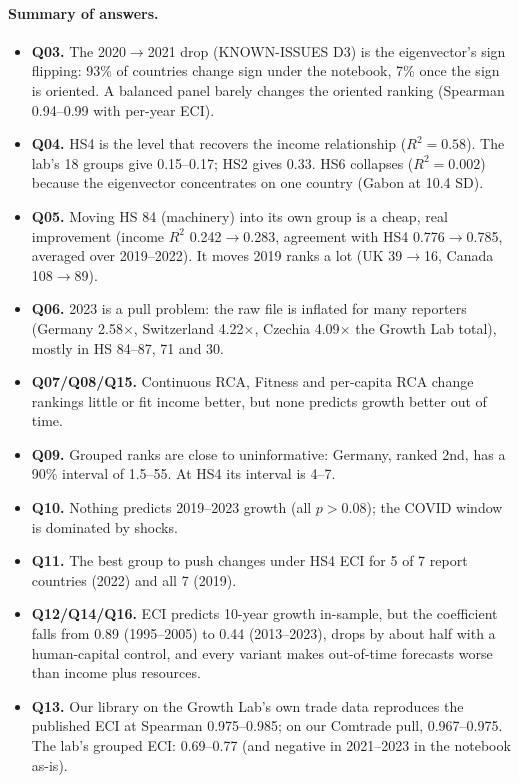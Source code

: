\documentclass[11pt]{article}
\begin{document}
\paragraph{Summary of answers.}
\begin{itemize}
\item \textbf{Q03.} The 2020$\rightarrow$2021 drop (KNOWN-ISSUES D3) is the eigenvector's sign flipping: 93\% of countries change sign under the notebook, 7\% once the sign is oriented. A balanced panel barely changes the oriented ranking (Spearman 0.94--0.99 with per-year ECI).
\item \textbf{Q04.} HS4 is the level that recovers the income relationship ($R^2=0.58$). The lab's 18 groups give 0.15--0.17; HS2 gives 0.33. HS6 collapses ($R^2=0.002$) because the eigenvector concentrates on one country (Gabon at 10.4 SD).
\item \textbf{Q05.} Moving HS 84 (machinery) into its own group is a cheap, real improvement (income $R^2$ 0.242$\rightarrow$0.283, agreement with HS4 0.776$\rightarrow$0.785, averaged over 2019--2022). It moves 2019 ranks a lot (UK 39$\rightarrow$16, Canada 108$\rightarrow$89).
\item \textbf{Q06.} 2023 is a pull problem: the raw file is inflated for many reporters (Germany 2.58$\times$, Switzerland 4.22$\times$, Czechia 4.09$\times$ the Growth Lab total), mostly in HS 84--87, 71 and 30.
\item \textbf{Q07/Q08/Q15.} Continuous RCA, Fitness and per-capita RCA change rankings little or fit income better, but none predicts growth better out of time.
\item \textbf{Q09.} Grouped ranks are close to uninformative: Germany, ranked 2nd, has a 90\% interval of 1.5--55. At HS4 its interval is 4--7.
\item \textbf{Q10.} Nothing predicts 2019--2023 growth (all $p>0.08$); the COVID window is dominated by shocks.
\item \textbf{Q11.} The best group to push changes under HS4 ECI for 5 of 7 report countries (2022) and all 7 (2019).
\item \textbf{Q12/Q14/Q16.} ECI predicts 10-year growth in-sample, but the coefficient falls from 0.89 (1995--2005) to 0.44 (2013--2023), drops by about half with a human-capital control, and every variant makes out-of-time forecasts worse than income plus resources.
\item \textbf{Q13.} Our library on the Growth Lab's own trade data reproduces the published ECI at Spearman 0.975--0.985; on our Comtrade pull, 0.967--0.975. The lab's grouped ECI: 0.69--0.77 (and negative in 2021--2023 in the notebook as-is).
\end{itemize}
\end{document}
